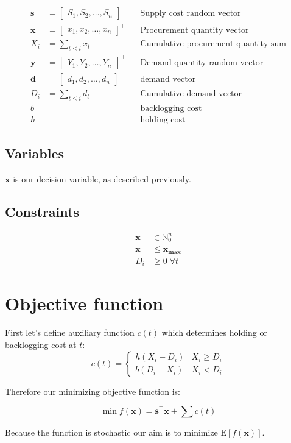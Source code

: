 \begin{align*}
    \mathbf{s} &= \begin{bmatrix}
        S_1, S_2, \dotsc, S_n
    \end{bmatrix}^\intercal && \text{Supply cost random vector} \\
    \mathbf{x} &= \begin{bmatrix}
        x_1, x_2, \dotsc, x_n
    \end{bmatrix}^\intercal && \text{Procurement quantity vector} \\
    X_i &= \sum_{t\le i}{x_t} && \text{Cumulative procurement quantity sum} \\
    \mathbf{y} &= \begin{bmatrix}
        Y_1, Y_2, \dotsc, Y_n
    \end{bmatrix}^\intercal && \text{Demand quantity random vector} \\
    \mathbf{d} &= \begin{bmatrix}
        d_1, d_2, \dotsc, d_n
    \end{bmatrix} && \text{demand vector} \\
    D_i &= \sum_{t\le i}{d_t} && \text{Cumulative demand vector} \\
    b & && \text{backlogging cost} \\
    h & && \text{holding cost}
\end{align*}

\subsection{Variables}
\label{sub:Variables}
$\mathbf{x}$ is our decision variable, as described previously.
\subsection{Constraints}
\label{sub:Constraints}
\begin{align*}
    \mathbf{x} &\in \mathbb{N}_0^n \\
    \mathbf{x} &\le \mathbf{x_{\text{max}}}\\
    D_i &\ge 0 \; \forall t
\end{align*}

\section{Objective function}

First let's define auxiliary function $c(t)$ which determines holding or backlogging cost at $t$:
\[
    c(t) = \begin{cases}
        h \left( X_i - D_i \right) & X_i \ge D_i \\
        b \left( D_i - X_i \right) & X_i < D_i
    \end{cases}
\]

Therefore our minimizing objective function is:

\[
    \min f(\mathbf{x}) = \mathbf{s}^\intercal\mathbf{x} + \sum{c(t)}
\]

Because the function is stochastic our aim is to minimize $ \text{E} \left[ f(\mathbf{x}) \right]$.
